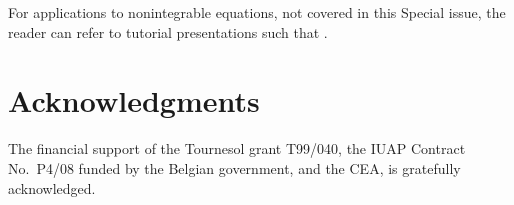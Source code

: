 \documentclass[10pt]{article}
\begin{document}
For applications to nonintegrable equations,
not covered in this Special issue,
the reader can refer to tutorial presentations such that
\cite{CetraroConte,Cargese1996Musette}.

\section*{Acknowledgments}

The financial support of the Tournesol grant T99/040,
the IUAP Contract No.~P4/08 funded by the Belgian government,
and the CEA, is gratefully acknowledged.

\vfill \eject

\printindex

\end{document}
